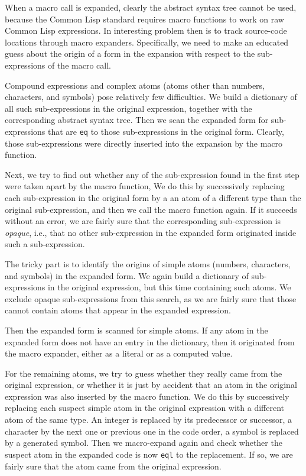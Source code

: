 \documentclass{article}
\begin{document}
When a macro call is expanded, clearly the abstract syntax tree cannot
be used, because the Common Lisp standard requires macro functions to
work on raw Common Lisp expressions.  In interesting problem then is
to track source-code locations through macro expanders.  Specifically,
we need to make an educated guess about the origin of a form in the
expansion with respect to the sub-expressions of the macro call.

Compound expressions and complex atoms (atoms other than numbers,
characters, and symbols) pose relatively few difficulties.  We build a
dictionary of all such sub-expressions in the original expression,
together with the corresponding abstract syntax tree.  Then we scan
the expanded form for sub-expressions that are \texttt{eq} to those
sub-expressions in the original form.  Clearly, those sub-expressions
were directly inserted into the expansion by the macro function.

Next, we try to find out whether any of the sub-expression found in
the first step were taken apart by the macro function, We do this by
successively replacing each sub-expression in the original form by a
an atom of a different type than the original sub-expression, and then
we call the macro function again.  If it succeeds without an error, we
are fairly sure that the corresponding sub-expression is
\emph{opaque}, i.e., that no other sub-expression in the expanded form
originated inside such a sub-expression.

The tricky part is to identify the origins of simple atoms (numbers,
characters, and symbols) in the expanded form.  We again build a
dictionary of sub-expressions in the original expression, but this
time containing such atoms.  We exclude opaque sub-expressions from
this search, as we are fairly sure that those cannot contain atoms
that appear in the expanded expression.

Then the expanded form is scanned for simple atoms.  If any atom in
the expanded form does not have an entry in the dictionary, then it
originated from the macro expander, either as a literal or as a
computed value.

For the remaining atoms, we try to guess whether they really came from
the original expression, or whether it is just by accident that an
atom in the original expression was also inserted by the macro
function.  We do this by successively replacing each suspect simple
atom in the original expression with a different atom of the same
type.  An integer is replaced by its predecessor or successor, a
character by the next one or previous one in the code order, a symbol
is replaced by a generated symbol.  Then we macro-expand again and
check whether the suspect atom in the expanded code is now
\texttt{eql} to the replacement.  If so, we are fairly sure that the
atom came from the original expression.
\end{document}
